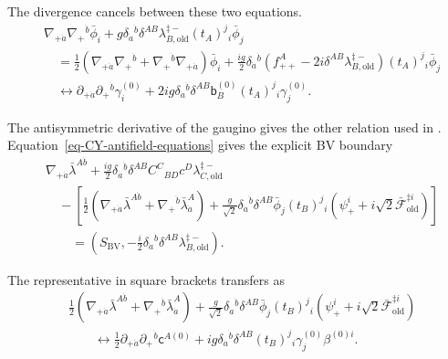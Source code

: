 \documentclass[11pt]{article}
\numberwithin{equation}{section}
\numberwithin{figure}{section}
\numberwithin{table}{section}
\begin{document}
\begin{proofbox}
The divergence cancels between these two equations.
\begin{equation}\label{eq-B-16}
\begin{aligned}
&\nabla_{+\dot a}\nabla_+{}^{\dot b}\bar\phi_i
+g\delta_{\dot a}{}^{\dot b}\delta^{AB}\lambda_{B,\mathrm{old}}^{\ddagger-}
 (t_A)^j{}_i\bar\phi_j\\
&\quad=\frac12\left(\nabla_{+\dot a}\nabla_+{}^{\dot b}
+\nabla_+{}^{\dot b}\nabla_{+\dot a}\right)\bar\phi_i
+\frac{ig}{2}\delta_{\dot a}{}^{\dot b}
 \left(f_{++}^A-2i\delta^{AB}\lambda_{B,\mathrm{old}}^{\ddagger-}\right)
 (t_A)^j{}_i\bar\phi_j\\
&\quad\longleftrightarrow
\partial_{+\dot a}\partial_+{}^{\dot b}\gamma_i^{(0)}
+2ig\delta_{\dot a}{}^{\dot b}\delta^{AB}\mathsf b_B^{(0)}
 (t_A)^j{}_i\gamma_j^{(0)}.
\end{aligned}
\end{equation}

The antisymmetric derivative of the gaugino gives the other relation used in \cite[Eq.~(2.4)]{ChangYin}. Equation~\eqref{eq-CY-antifield-equations} gives the explicit BV boundary
\begin{equation}\label{eq-B-17}
\begin{aligned}
&\nabla_{+\dot a}\bar\lambda^{A\dot b}
+\frac{ig}{2}\delta_{\dot a}{}^{\dot b}\delta^{AB}
 C^C{}_{BD}c^D\lambda_{C,\mathrm{old}}^{\ddagger-}\\
&\quad-\left[\frac12\left(\nabla_{+\dot a}\bar\lambda^{A\dot b}
+\nabla_+{}^{\dot b}\bar\lambda_{\dot a}^A\right)
+\frac g{\sqrt2}\delta_{\dot a}{}^{\dot b}\delta^{AB}
 \bar\phi_j(t_B)^j{}_i
 \left(\psi_+^i+i\sqrt2\bar{\mathcal F}_{\mathrm{old}}^{\ddagger i}\right)\right]\\
&\qquad=\left(S_{\mathrm{BV}},
 -\frac i2\delta_{\dot a}{}^{\dot b}\delta^{AB}\lambda_{B,\mathrm{old}}^{\ddagger-}\right).
\end{aligned}
\end{equation}

The representative in square brackets transfers as
\begin{equation}\label{eq-CY-gaugino-transferred}
\begin{aligned}
&\frac12\left(\nabla_{+\dot a}\bar\lambda^{A\dot b}
+\nabla_+{}^{\dot b}\bar\lambda_{\dot a}^A\right)
+\frac g{\sqrt2}\delta_{\dot a}{}^{\dot b}\delta^{AB}
\bar\phi_j(t_B)^j{}_i
\left(\psi_+^i+i\sqrt2\bar{\mathcal F}_{\mathrm{old}}^{\ddagger i}\right)\\
&\qquad\longleftrightarrow
\frac12\partial_{+\dot a}\partial_+{}^{\dot b}\mathsf c^{A(0)}
+ig\delta_{\dot a}{}^{\dot b}\delta^{AB}(t_B)^j{}_i
\gamma_j^{(0)}\beta^{(0)i}.
\end{aligned}
\end{equation}
\end{proofbox}
\end{document}
